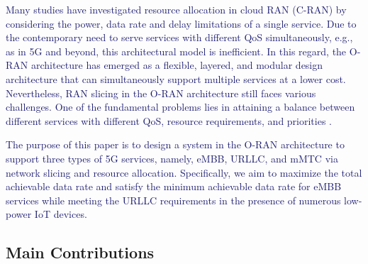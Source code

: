 \documentclass[lettersize,journal]{IEEEtran}
\begin{document}
\textcolor{MidnightBlue}{Many studies have investigated resource allocation in cloud RAN (C-RAN) by considering the power, data rate and delay limitations of a single service. Due to the contemporary need to serve services with different QoS simultaneously, e.g., as in 5G and beyond, this architectural model is inefficient. In this regard, the O-RAN architecture has emerged as a flexible, layered, and modular design architecture that can simultaneously support multiple services at a lower cost. Nevertheless, RAN slicing in the O-RAN architecture still faces various challenges. 
One of the fundamental problems lies in attaining a balance between different services with different QoS, resource requirements, and priorities \cite{ORANArch, gavrilovska2020cloud, kazemifard2021minimum, shen2020ai}.  }

\textcolor{MidnightBlue}{The purpose of this paper is to design a system in the O-RAN architecture to support three types of 5G services, namely, eMBB, URLLC, and mMTC via network slicing and resource allocation. Specifically, we aim to maximize the total achievable data rate and satisfy the minimum achievable data rate for eMBB services while meeting the URLLC requirements in the presence of numerous low-power IoT devices.}

\subsection{Main Contributions}
\end{document}
